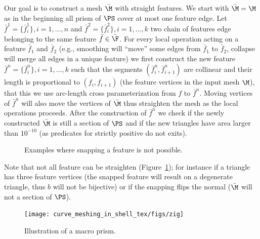 Our goal is to construct a mesh $\bar\M$ with straight features. We start with $\bar\M = \M$ as in the beginning all prism of $\PS$ cover at most one feature edge. Let $\bar f^1 = \{\bar f_i^1\}, i=1,\dots,n$ and $\bar f^2 = \{\bar f_i^2\}, i=1,\dots,k$ two chain of features edge belonging to the same feature $\bar f \in \bar\F$.
For every local operation acting on a feature $\bar f_1$ and $\bar f_2$ (e.g., smoothing will ``move'' some edges from $\bar f_1$ to $\bar f_2$, collapse will merge all edges in a unique feature) we first construct the new feature $\bar f^n = \{\bar f_i^n\}, i=1,\dots,k$ such that the segments $(\bar f_i^n, \bar f_{i+1}^n)$ are collinear and their length is proportional to $( f_i, f_{i+1})$ (the feature vertices in the input mesh $\M$), that this we use arc-length cross parameterization from $f$ to $\bar f^n$. Moving vertices of $\bar f^n$ will also move the vertices of $\bar\M$ thus straighten the mesh as the local operations proceeds. After the construction of $\bar f^n$ we check if the newly constructed $\bar\M$ is still a section of $\PS$ and if the new triangles have area larger than $10^{-10}$ (as predicates for strictly positive do not exits).


\begin{figure}
    \centering
    \caption{Examples where snapping a feature is not possible.}
    \label{bichon:fig:snapping-fail}
\end{figure}

Note that not all feature can be straighten (Figure~\ref{bichon:fig:snapping-fail}); for instance if a triangle has three feature vertices (the snapped feature will result on a degenerate triangle, thus $b$ will not be bijective) or if the snapping flips the normal ($\bar\M$ will not a section of $\PS$).


\begin{figure}
    \centering
    \texttt{[image: curve\_meshing\_in\_shell\_tex/figs/zig]}
    \caption{Illustration of a macro prism.}
    \label{bichon:fig:zig}
\end{figure}
